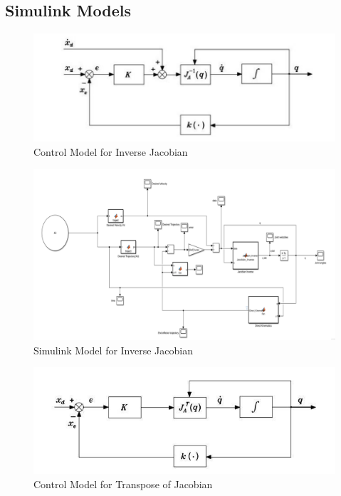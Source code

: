 \documentclass[12pt]{report}
\begin{document}
		\subsection{Simulink Models}
			\begin{figure}[H]
			\centering
			\includegraphics[scale=0.7]{S0} %
			\caption{Control Model for Inverse Jacobian}
			\label{run10} %
		\end{figure}
			\begin{figure}[H]
			\centering
			\includegraphics[scale=0.7]{S1} %
			\caption{Simulink Model for Inverse Jacobian}
			\label{run10} %
		\end{figure}
			\begin{figure}[H]
			\centering
			\includegraphics[scale=0.7]{S2} %
			\caption{Control Model for Transpose of Jacobian}
			\label{run10} %
		\end{figure}
\end{document}
